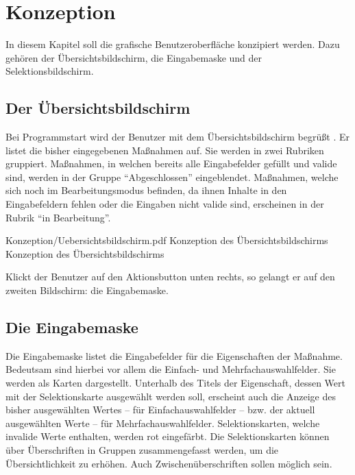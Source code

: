 \chapter{Konzeption}
\label{chap:Konzeption}

In diesem Kapitel soll die grafische Benutzeroberfläche konzipiert werden.
Dazu gehören der Übersichtsbildschirm,
die Eingabemaske und der Selektionsbildschirm.

\section{Der Übersichtsbildschirm}

Bei Programmstart wird der Benutzer mit dem Übersichtsbildschirm begrüßt \Abb{\ref{fig:KonzeptionÜbersichtsbildschirm}} .
Er listet die bisher eingegebenen Maßnahmen auf. Sie werden in zwei Rubriken gruppiert.
Maßnahmen, in welchen bereits alle Eingabefelder gefüllt und valide sind, werden in der Gruppe \enquote{Abgeschlossen} eingeblendet.
Maßnahmen, welche sich noch im Bearbeitungsmodus befinden,
da ihnen Inhalte in den Eingabefeldern fehlen oder die Eingaben nicht valide sind,
erscheinen in der Rubrik \enquote{in Bearbeitung}. 



\begin{alexfigure}{Konzeption/Uebersichtsbildschirm.pdf}
  {Konzeption des Übersichtsbildschirms}
  {Konzeption des Übersichtsbildschirms}

  \label{fig:KonzeptionÜbersichtsbildschirm}

\end{alexfigure}

Klickt der Benutzer auf den Aktionsbutton unten rechts, so gelangt er auf den zweiten Bildschirm: die Eingabemaske.

\section{Die Eingabemaske}

Die Eingabemaske \Abb{\ref{fig:KonzeptionEingabemaske}} listet die Eingabefelder für die  Eigenschaften der Maßnahme.
Bedeutsam sind hierbei vor allem die Einfach- und Mehrfachauswahlfelder.
Sie werden als Karten dargestellt.
Unterhalb des Titels der Eigenschaft,
dessen Wert mit der Selektionskarte ausgewählt werden soll,
erscheint auch die Anzeige des bisher ausgewählten Wertes
-- für Einfachauswahlfelder --
bzw. der aktuell ausgewählten Werte
-- für Mehrfachauswahlfelder.
Selektionskarten, welche invalide Werte enthalten, werden rot eingefärbt.
Die Selektionskarten können über Überschriften in Gruppen zusammengefasst werden,
um die Übersichtlichkeit zu erhöhen.
Auch Zwischenüberschriften sollen möglich sein.

